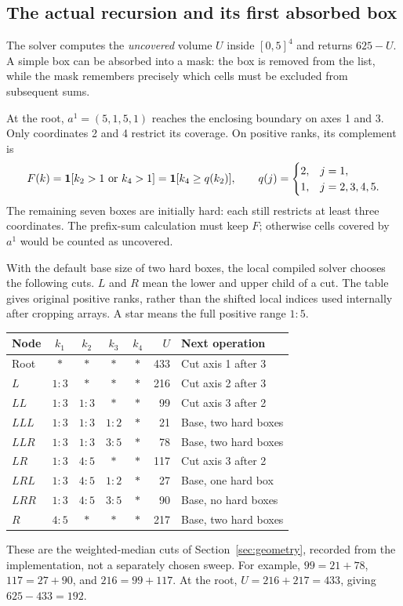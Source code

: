 \clearpage
\subsection{The actual recursion and its first absorbed box}
The solver computes the \emph{uncovered} volume $U$ inside $[0,5]^4$
and returns $625-U$. A simple box can be absorbed into a mask: the
box is removed from the list, while the mask remembers precisely which
cells must be excluded from subsequent sums.

At the root, $a^1=(5,1,5,1)$ reaches the enclosing boundary on axes
1 and 3. Only coordinates 2 and 4 restrict its coverage. On positive
ranks, its complement is
\[
 F(k)=\mathbf 1[k_2>1\ \text{or}\ k_4>1]
     =\mathbf 1[k_4\ge q(k_2)],\qquad
 q(j)=\begin{cases}2,&j=1,\\1,&j=2,3,4,5.\end{cases}
\]
The remaining seven boxes are initially hard: each still restricts at
least three coordinates. The prefix-sum calculation must keep $F$;
otherwise cells covered by $a^1$ would be counted as uncovered.

With the default base size of two hard boxes, the local compiled solver
chooses the following cuts. $L$ and $R$ mean the lower and upper child
of a cut. The table gives original positive ranks, rather than the
shifted local indices used internally after cropping arrays. A star
means the full positive range $1{:}5$.
\begin{center}
\small
\begin{tabular}{@{}lccccrl@{}}
\toprule
Node&$k_1$&$k_2$&$k_3$&$k_4$&$U$&Next operation\\\midrule
Root&$*$&$*$&$*$&$*$&433&Cut axis 1 after 3\\
$L$&$1{:}3$&$*$&$*$&$*$&216&Cut axis 2 after 3\\
$LL$&$1{:}3$&$1{:}3$&$*$&$*$&99&Cut axis 3 after 2\\
$LLL$&$1{:}3$&$1{:}3$&$1{:}2$&$*$&21&Base, two hard boxes\\
$LLR$&$1{:}3$&$1{:}3$&$3{:}5$&$*$&78&Base, two hard boxes\\
$LR$&$1{:}3$&$4{:}5$&$*$&$*$&117&Cut axis 3 after 2\\
$LRL$&$1{:}3$&$4{:}5$&$1{:}2$&$*$&27&Base, one hard box\\
$LRR$&$1{:}3$&$4{:}5$&$3{:}5$&$*$&90&Base, no hard boxes\\
$R$&$4{:}5$&$*$&$*$&$*$&217&Base, two hard boxes\\\bottomrule
\end{tabular}
\end{center}
These are the weighted-median cuts of Section~\ref{sec:geometry},
recorded from the implementation, not a separately chosen sweep.
For example, $99=21+78$, $117=27+90$, and $216=99+117$.
At the root, $U=216+217=433$, giving $625-433=192$.

